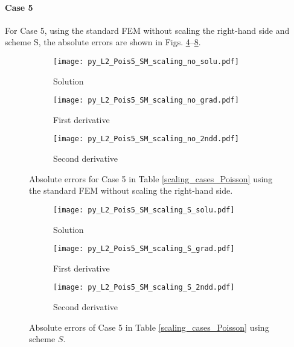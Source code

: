 \documentclass[review,3p]{elsarticle}
\begin{document}
\paragraph{Case 5}
For Case 5, using the standard FEM without scaling the right-hand side and scheme S, the absolute errors are shown in Figs. \ref{py_L2_Pois5_SM_scaling_no}--\ref{py_L2_Pois5_SM_scaling_S}.

\begin{figure}[!ht]
    \begin{subfigure}{5.5cm}
        \texttt{[image: py\_L2\_Pois5\_SM\_scaling\_no\_solu.pdf]}
        \caption{Solution}
        \label{py_L2_Pois5_SM_scaling_no_solu}
    \end{subfigure}
    \hspace{-0.2cm}
    \begin{subfigure}{5.5cm}
        \texttt{[image: py\_L2\_Pois5\_SM\_scaling\_no\_grad.pdf]}
        \caption{First derivative}
        \label{py_L2_Pois5_SM_scaling_no_grad}
    \end{subfigure}
    \hspace{-0.2cm}
    \begin{subfigure}{5.5cm}
        \texttt{[image: py\_L2\_Pois5\_SM\_scaling\_no\_2ndd.pdf]}
        \caption{Second derivative}
        \label{py_L2_Pois5_SM_scaling_no_2ndd}
    \end{subfigure}
\caption{Absolute errors for Case 5 in Table \ref{scaling_cases_Poisson} using the standard FEM without scaling the right-hand side.}
\label{py_L2_Pois5_SM_scaling_no}
\end{figure}

\begin{figure}[!ht]
    \begin{subfigure}{5.5cm}
        \texttt{[image: py\_L2\_Pois5\_SM\_scaling\_S\_solu.pdf]}
        \caption{Solution}
        \label{py_L2_Pois5_SM_scaling_S_solu}
    \end{subfigure}
    \hspace{-0.2cm}
    \begin{subfigure}{5.5cm}
        \texttt{[image: py\_L2\_Pois5\_SM\_scaling\_S\_grad.pdf]}
        \caption{First derivative}
        \label{py_L2_Pois5_SM_scaling_S_grad}
    \end{subfigure}
    \hspace{-0.2cm}
    \begin{subfigure}{5.5cm}
        \texttt{[image: py\_L2\_Pois5\_SM\_scaling\_S\_2ndd.pdf]}
        \caption{Second derivative}
        \label{py_L2_Pois5_SM_scaling_S_2ndd}
    \end{subfigure}
\caption{Absolute errors of Case 5 in Table \ref{scaling_cases_Poisson} using scheme $S$.}
\label{py_L2_Pois5_SM_scaling_S}
\end{figure}
\end{document}
